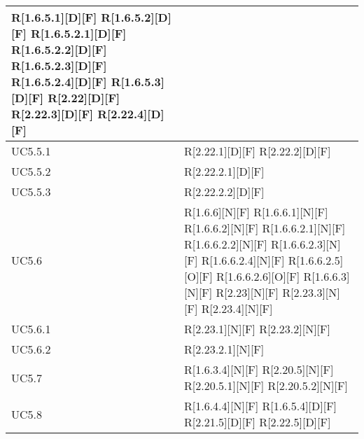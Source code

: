 \begin{longtable}{X | X}
R[1.6.5.1][D][F] \newline
R[1.6.5.2][D][F] \newline
R[1.6.5.2.1][D][F] \newline
R[1.6.5.2.2][D][F] \newline
R[1.6.5.2.3][D][F] \newline
R[1.6.5.2.4][D][F] \newline
R[1.6.5.3][D][F] \newline
R[2.22][D][F] \newline
R[2.22.3][D][F] \newline
R[2.22.4][D][F]  \\
\hline
UC5.5.1 & R[2.22.1][D][F] \newline
R[2.22.2][D][F]  \\
\hline
UC5.5.2 & R[2.22.2.1][D][F]  \\
\hline
UC5.5.3 & R[2.22.2.2][D][F]  \\
\hline
UC5.6 & R[1.6.6][N][F] \newline
R[1.6.6.1][N][F] \newline
R[1.6.6.2][N][F] \newline
R[1.6.6.2.1][N][F] \newline
R[1.6.6.2.2][N][F] \newline
R[1.6.6.2.3][N][F] \newline
R[1.6.6.2.4][N][F] \newline
R[1.6.6.2.5][O][F] \newline
R[1.6.6.2.6][O][F] \newline
R[1.6.6.3][N][F] \newline
R[2.23][N][F] \newline
R[2.23.3][N][F] \newline
R[2.23.4][N][F]  \\
\hline
UC5.6.1 & R[2.23.1][N][F] \newline
R[2.23.2][N][F]  \\
\hline
UC5.6.2 & R[2.23.2.1][N][F]  \\
\hline
UC5.7 & R[1.6.3.4][N][F] \newline
R[2.20.5][N][F] \newline
R[2.20.5.1][N][F] \newline
R[2.20.5.2][N][F]  \\
\hline
UC5.8 & R[1.6.4.4][N][F] \newline
R[1.6.5.4][D][F] \newline
R[2.21.5][D][F] \newline
R[2.22.5][D][F]  \\
\hline

\end{longtable}
